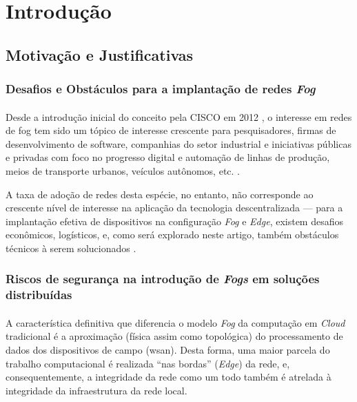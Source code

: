 \documentclass[12pt]{article}
\begin{document}
\tableofcontents

\printglossary[title=Glossário, toctitle=Glossário]

\section{Introdução} \label{sec:intro}
\subsection{Motivação e Justificativas}
\subsubsection{Desafios e Obstáculos para a implantação de redes \textit{Fog}}
\paragraph{}
Desde a introdução inicial do conceito pela CISCO em 2012 \cite{bonomi2012}, o interesse em redes de \gls{fog} tem
sido um tópico de interesse crescente para pesquisadores, firmas de desenvolvimento de software, companhias do setor
industrial e iniciativas públicas e privadas com foco no progresso digital e automação de linhas de produção, meios de
transporte urbanos, veículos autônomos, etc. \cite{srirama2024}. 

A taxa de adoção de redes desta espécie, no entanto, não corresponde ao crescente nível de interesse na
aplicação da tecnologia descentralizada --- para a implantação efetiva de dispositivos na configuração \textit{Fog} e
\textit{Edge}, existem desafios econômicos, logísticos, e, como será explorado neste artigo, também obstáculos técnicos
à serem solucionados \cite{srirama2024}.

\subsubsection{Riscos de segurança na introdução de \textit{Fogs} em soluções distribuídas}
\paragraph{}
A característica definitiva que diferencia o modelo \textit{Fog} da computação em \textit{Cloud} tradicional é a aproximação
(física assim como topológica) do processamento de dados dos dispositivos de campo (\gls{wsan}). Desta forma, uma maior
parcela do trabalho computacional é realizada ``nas bordas'' (\textit{Edge}) da rede, e, consequentemente, a integridade
da rede como um todo também é atrelada à integridade da infraestrutura da rede local.
\end{document}
